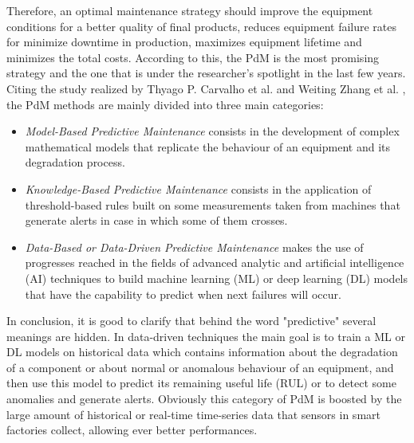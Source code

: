 Therefore, an optimal maintenance strategy should improve the equipment conditions for a better quality of final products, reduces equipment failure rates for minimize downtime in production, maximizes equipment lifetime and minimizes the total costs. According to this, the PdM is the most promising strategy and the one that is under the researcher's spotlight in the last few years. \\ 
Citing the study realized by Thyago P. Carvalho et al. \cite{3SystematicLiteratureReviewML} and Weiting Zhang et al. \cite{2DataDrivenMaintenance}, the PdM methods are mainly divided into three main categories: 
\begin{itemize}
\item{\textit{Model-Based Predictive Maintenance} consists in the development of complex mathematical models that replicate the behaviour of an equipment and its degradation process.}
\item{\textit{Knowledge-Based Predictive Maintenance} consists in the application of threshold-based rules built on some measurements taken from machines that generate alerts in case in which some of them crosses.}
\item{\textit{Data-Based or Data-Driven Predictive Maintenance} makes the use of progresses reached in the fields of advanced analytic and artificial intelligence (AI) techniques to build machine learning (ML) or deep learning (DL) models that have the capability to predict when next failures will occur. }
\end{itemize}
In conclusion, it is good to clarify that behind the word "predictive" several meanings are hidden. In data-driven techniques the main goal is to train a ML or DL models on historical data which contains information about the degradation of a component or about normal or anomalous behaviour of an equipment, and then use this model to predict its remaining useful life (RUL) or to detect some anomalies and generate alerts. Obviously this category of PdM is boosted by the large amount of historical or real-time time-series data that sensors in smart factories collect, allowing ever better performances.

